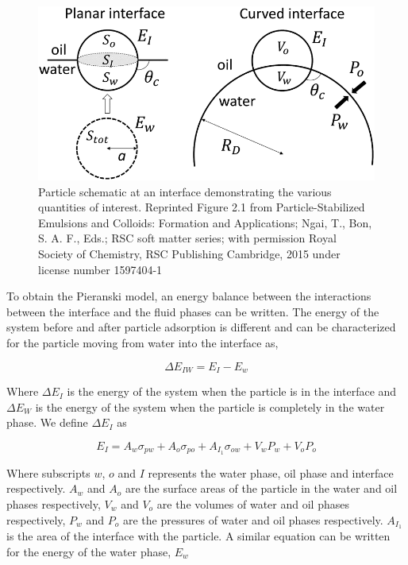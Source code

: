 \begin{figure}
    \centering
    \includegraphics[scale = 0.5]{../figures/literature_review/particle_at_interface.png }
    \caption{Particle schematic at an interface demonstrating the various quantities of interest. Reprinted Figure 2.1 from
             Particle-Stabilized Emulsions and Colloids: Formation and Applications; Ngai, T., Bon, S. A. F., Eds.; RSC soft matter series; 
             with permission Royal Society of Chemistry, RSC Publishing Cambridge, 2015 under license number 1597404-1}
    \label{fig:pieranski_model}
\end{figure}

To obtain the Pieranski model, an energy balance between the interactions between the interface and the fluid phases can be written. The energy of the system before and after particle adsorption is 
different and can be characterized for the particle moving from water into the interface as,

\begin{equation}
    \Delta E_{IW} = E_I - E_w
\end{equation}

Where $\Delta E_{I}$ is the energy of the system when the particle is in the interface and $\Delta E_W$ is the energy of the system when the particle is completely in the water phase.
We define $\Delta E_{I}$ as

\begin{equation}
    E_I = A_w \sigma_{pw} + A_o\sigma_{po} + A_{I_1}\sigma_{ow} + V_w P_w + V_o P_o
\end{equation}

Where subscripts $w$, $o$ and $I$ represents the water phase, oil phase and interface respectively. $A_w$ and $A_o$ are the surface areas of the particle in the water and oil phases 
respectively, $V_w$ and $V_o$ are the volumes of water and oil phases respectively, $P_w$ and $P_o$ are the pressures of water and oil phases respectively. $A_{I_1}$ is the area of the 
interface with the particle. A similar equation can be written for the energy of the water phase, $E_w$

